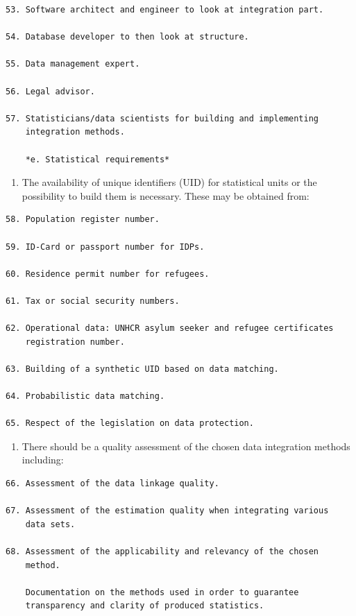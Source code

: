 \documentclass[
]{article}
\providecommand{\tightlist}{%
  \setlength{\itemsep}{0pt}\setlength{\parskip}{0pt}}
\begin{document}
\begin{verbatim}
53. Software architect and engineer to look at integration part.

54. Database developer to then look at structure.

55. Data management expert.

56. Legal advisor.

57. Statisticians/data scientists for building and implementing
    integration methods.

    *e. Statistical requirements*
\end{verbatim}

\begin{enumerate}
\def\labelenumi{\arabic{enumi}.}
\setcounter{enumi}{209}
\tightlist
\item
  The availability of unique identifiers (UID) for statistical units
  or the possibility to build them is necessary. These may be obtained
  from:
\end{enumerate}

\begin{verbatim}
58. Population register number.

59. ID-Card or passport number for IDPs.

60. Residence permit number for refugees.

61. Tax or social security numbers.

62. Operational data: UNHCR asylum seeker and refugee certificates
    registration number.

63. Building of a synthetic UID based on data matching.

64. Probabilistic data matching.

65. Respect of the legislation on data protection.
\end{verbatim}

\begin{enumerate}
\def\labelenumi{\arabic{enumi}.}
\setcounter{enumi}{210}
\tightlist
\item
  There should be a quality assessment of the chosen data integration
  methods including:
\end{enumerate}

\begin{verbatim}
66. Assessment of the data linkage quality.

67. Assessment of the estimation quality when integrating various
    data sets.

68. Assessment of the applicability and relevancy of the chosen
    method.

    Documentation on the methods used in order to guarantee
    transparency and clarity of produced statistics.
\end{verbatim}
\end{document}
